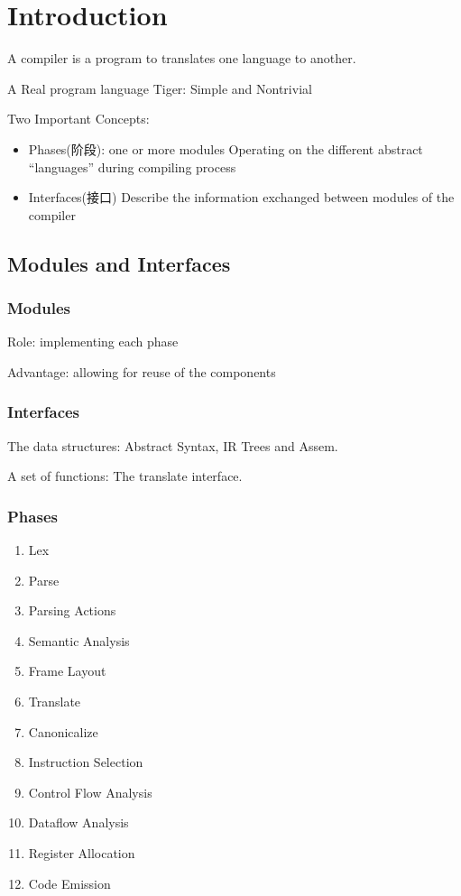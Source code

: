 \newpage
\section{Introduction}

A compiler is a program to translates one language to another.

A Real program language Tiger: Simple and Nontrivial

Two Important Concepts:
\begin{itemize}
    \item Phases(阶段): one or more modules
    \subitem Operating on the different abstract ``languages'' during compiling process
    \item Interfaces(接口)
    \subitem Describe the information exchanged between modules of the compiler
\end{itemize}

\subsection{Modules and Interfaces}

\subsubsection{Modules}
Role: implementing each phase

Advantage: allowing for reuse of the components

\subsubsection{Interfaces}
The data structures: Abstract Syntax, IR Trees and Assem.

A set of functions: The translate interface.

\subsubsection{Phases}
\begin{enumerate}
    \item Lex
    \item Parse
    \item Parsing Actions
    \item Semantic Analysis
    \item Frame Layout
    \item Translate
    \item Canonicalize
    \item Instruction Selection
    \item Control Flow Analysis
    \item Dataflow Analysis
    \item Register Allocation
    \item Code Emission
\end{enumerate}

